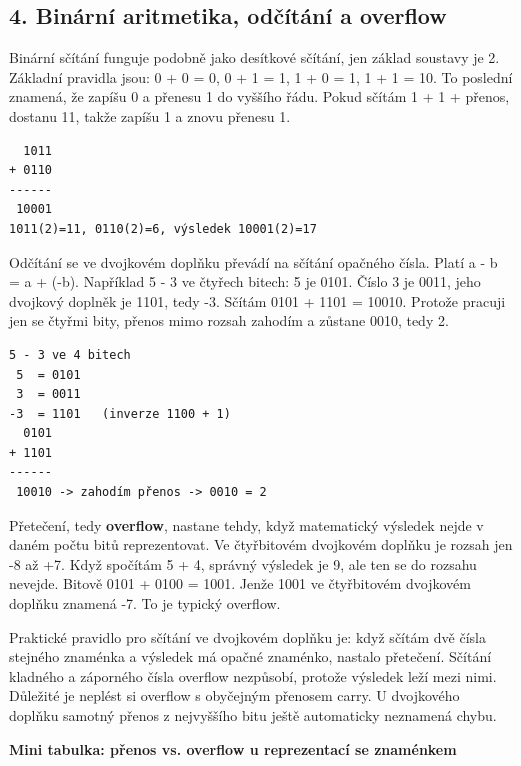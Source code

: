 \documentclass[11pt,a4paper]{article}
\newcommand{\itbox}[1]{\medskip\noindent\colorbox{black!6}{\parbox{\dimexpr\linewidth-2\fboxsep}{#1}}\medskip}
\begin{document}
\subsection*{4. Binární aritmetika, odčítání a overflow}

Binární sčítání funguje podobně jako desítkové sčítání, jen základ soustavy je 2. Základní pravidla jsou: 0 + 0 = 0, 0 + 1 = 1, 1 + 0 = 1, 1 + 1 = 10. To poslední znamená, že zapíšu 0 a přenesu 1 do vyššího řádu. Pokud sčítám 1 + 1 + přenos, dostanu 11, takže zapíšu 1 a znovu přenesu 1.

\begin{codebox}
\small
\begin{verbatim}
  1011
+ 0110
------
 10001
1011(2)=11, 0110(2)=6, výsledek 10001(2)=17
\end{verbatim}
\end{codebox}

Odčítání se ve dvojkovém doplňku převádí na sčítání opačného čísla. Platí a - b = a + (-b). Například 5 - 3 ve čtyřech bitech: 5 je 0101. Číslo 3 je 0011, jeho dvojkový doplněk je 1101, tedy -3. Sčítám 0101 + 1101 = 10010. Protože pracuji jen se čtyřmi bity, přenos mimo rozsah zahodím a zůstane 0010, tedy 2.

\begin{codebox}
\small
\begin{verbatim}
5 - 3 ve 4 bitech
 5  = 0101
 3  = 0011
-3  = 1101   (inverze 1100 + 1)
  0101
+ 1101
------
 10010 -> zahodím přenos -> 0010 = 2
\end{verbatim}
\end{codebox}

Přetečení, tedy \textbf{overflow}, nastane tehdy, když matematický výsledek nejde v daném počtu bitů reprezentovat. Ve čtyřbitovém dvojkovém doplňku je rozsah jen -8 až +7. Když spočítám 5 + 4, správný výsledek je 9, ale ten se do rozsahu nevejde. Bitově 0101 + 0100 = 1001. Jenže 1001 ve čtyřbitovém dvojkovém doplňku znamená -7. To je typický overflow.

Praktické pravidlo pro sčítání ve dvojkovém doplňku je: když sčítám dvě čísla stejného znaménka a výsledek má opačné znaménko, nastalo přetečení. Sčítání kladného a záporného čísla overflow nezpůsobí, protože výsledek leží mezi nimi. Důležité je neplést si overflow s obyčejným přenosem carry. U dvojkového doplňku samotný přenos z nejvyššího bitu ještě automaticky neznamená chybu.

\itbox{\textbf{Mini tabulka: přenos vs. overflow u reprezentací se znaménkem}}
\end{document}
